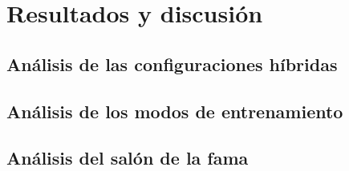 \chapter{Resultados y discusión} \label{chap:resultados}


\section{Análisis de las configuraciones híbridas} \label{sec:analisis_configuraciones_hibridas}


\section{Análisis de los modos de entrenamiento} \label{sec:analisis_modos_entrenamiento}


\section{Análisis del salón de la fama} \label{sec:analisis_salon_fama}







